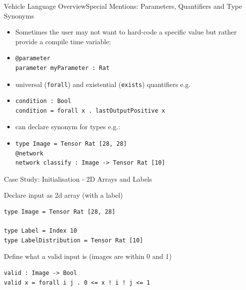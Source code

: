 \documentclass[t,compress,aspectratio=169]{beamer}
\newcommand{\vehicle}[1]{{\texttt{#1}}}
\begin{document}
\begin{frame}[containsverbatim]{Vehicle Language Overview}{Special Mentions: Parameters, Quantifiers and Type Synonyms}

\begin{itemize}
    \item Sometimes the user may not want to hard-code a specific value but rather provide a compile time variable:    
    \item[]\begin{verbatim}
@parameter
parameter myParameter : Rat
\end{verbatim} 
\end{itemize}

\begin{itemize}
    \item universal (\vehicle{forall}) and existential (\vehicle{exists}) quantifiers e.g. 
\item[]\begin{verbatim}
condition : Bool
condition = forall x . lastOutputPositive x
\end{verbatim}
\end{itemize}

\begin{itemize}
    \item can declare synonym for types e.g.:
\item[]\begin{verbatim}
type Image = Tensor Rat [28, 28]
@network
network classify : Image -> Tensor Rat [10]
\end{verbatim}
\end{itemize}



\end{frame}


\begin{frame}[fragile]{Case Study: Initialisation - 2D Arrays and Labels}

Declare input as 2d array (with a label)

\begin{verbatim}
type Image = Tensor Rat [28, 28]

type Label = Index 10
type LabelDistribution = Tensor Rat [10]

\end{verbatim}


Define what a valid input is (images are within 0 and 1)


\begin{verbatim}
valid : Image -> Bool
valid x = forall i j . 0 <= x ! i ! j <= 1

\end{verbatim}

\end{frame}
\end{document}
